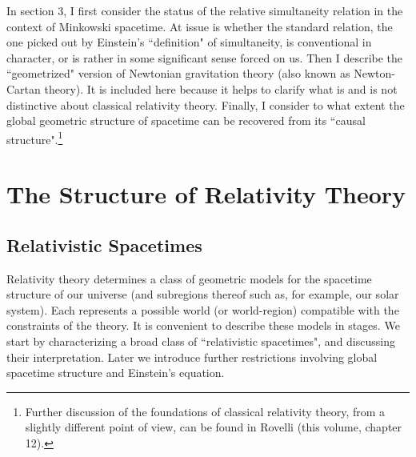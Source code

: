 \documentclass [12] {article}
\theoremstyle{plain}
\numberwithin{figure}{subsection}
\numberwithin{proposition}{subsection}
\begin{document}
 In section 3, I  first consider the status of the relative simultaneity relation in the context of Minkowski spacetime.  At issue is whether the standard relation, the one picked out by  Einstein's ``definition" of simultaneity, is conventional in character, or is rather in some significant sense forced on us.  Then I  describe the ``geometrized" version of Newtonian gravitation theory (also known as Newton-Cartan theory).  It is included here because it helps to clarify what is and is not distinctive about classical relativity theory. Finally, I consider to what extent the global geometric structure of spacetime can be recovered from its ``causal structure".\footnote{Further discussion of the foundations of classical relativity theory, from a slightly different point of view, can be found in Rovelli (this volume,  chapter 12).}  


\section{The Structure of Relativity Theory}

\subsection{Relativistic  Spacetimes} \label{Relativistic  Spacetimes}

Relativity theory determines a class of geometric models for the spacetime structure of our universe (and subregions thereof such as, for example, our solar system).  Each represents a possible world (or world-region)  compatible with the constraints of the theory. 
It is convenient to describe these models in stages. We start by characterizing a broad class of ``relativistic spacetimes", and discussing their interpretation.  Later we introduce  further restrictions involving global spacetime structure and  Einstein's equation.  
\end{document}
